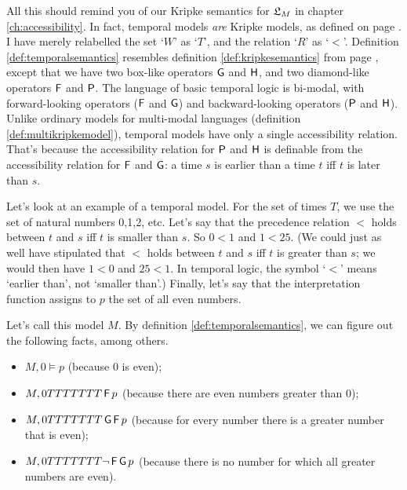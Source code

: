 All this should remind you of our Kripke semantics for $\mathfrak{L}_M$ in chapter
\ref{ch:accessibility}. In fact, temporal models \emph{are} Kripke models, as
defined on page \pageref{def:kripkemodel}. I have merely relabelled the set
`$W$' as `$T$', and the relation `$R$' as `$<$'. Definition
\ref{def:temporalsemantics} resembles definition \ref{def:kripkesemantics} from
page \pageref{def:kripkesemantics}, except that we have two box-like operators
$\operatorname{\mathsf{G}}$ and $\operatorname{\mathsf{H}}$, and two diamond-like operators $\operatorname{\mathsf{F}}$ and $\operatorname{\mathsf{P}}$. The language of
basic temporal logic is bi-modal, with forward-looking operators ($\operatorname{\mathsf{F}}$ and
$\operatorname{\mathsf{G}}$) and backward-looking operators ($\operatorname{\mathsf{P}}$ and $\operatorname{\mathsf{H}}$). Unlike ordinary models
for multi-modal languages (definition \ref{def:multikripkemodel}), temporal
models have only a single accessibility relation. That's because
the accessibility relation for $\operatorname{\mathsf{P}}$ and $\operatorname{\mathsf{H}}$ is definable from the
accessibility relation for $\operatorname{\mathsf{F}}$ and $\operatorname{\mathsf{G}}$: a time $s$ is earlier than a time
$t$ iff $t$ is later than $s$.


Let's look at an example of a temporal model. For the set of times $T$, we use
the set of natural numbers 0,1,2, etc. Let's say that the precedence relation
$<$ holds between $t$ and $s$ iff $t$ is smaller than $s$. So $0<1$ and
$1 < 25$. (We could just as well have stipulated that $<$ holds between $t$ and
$s$ iff $t$ is greater than $s$; we would then have $1<0$ and $25<1$. In
temporal logic, the symbol `$<$' means `earlier than', not `smaller than'.)
Finally, let's say that the interpretation function assigns to $p$ the set of
all even numbers.

Let's call this model $M$. By definition \ref{def:temporalsemantics}, we can
figure out the following facts, among others.
\begin{itemize}[leftmargin=10mm]
\itemsep-1mm
\item $M,0 \models p$ (because 0 is even);
\item $M,0 TTTTTTT \operatorname{\mathsf{F}} p$ (because there are even numbers greater than 0);
\item $M,0 TTTTTTT \operatorname{\mathsf{G}}\operatorname{\mathsf{F}} p$ (because for every number there is a greater number that is even);
\item $M,0 TTTTTTT \neg\operatorname{\mathsf{F}}\operatorname{\mathsf{G}} p$ (because there is no number for which all greater numbers are even).
\end{itemize}

